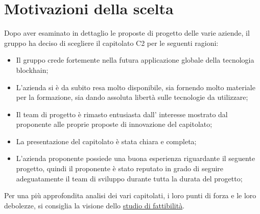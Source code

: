 \section{Motivazioni della scelta}\label{section:motivazioni}

Dopo aver esaminato in dettaglio le proposte di progetto delle varie aziende,
 il gruppo ha deciso di scegliere il capitolato C2 per le seguenti ragioni:
\begin{itemize}
    \item Il gruppo crede fortemente nella futura applicazione globale della tecnologia blockhain;
    \item L'azienda si è da subito resa molto disponibile, sia fornendo molto materiale per la formazione, sia dando assoluta libertà sulle tecnologie da utilizzare;
    \item Il team di progetto è rimasto entusiasta dall' interesse mostrato dal proponente alle proprie proposte di innovazione del capitolato;
    \item La presentazione del capitolato è stata chiara e completa;
    \item L'azienda proponente possiede una buona esperienza riguardante il seguente progetto, quindi il proponente è stato reputato in grado di seguire adeguatamente il team di sviluppo durante tutta la durata del progetto;
\end{itemize}

Per una più approfondita analisi dei vari capitolati,
 i loro punti di forza e le loro debolezze, si consiglia la visione dello \href{https://yakuzaishi-swe.github.io/docs/docs/studio_fattibilita.pdf}{studio di fattibilità}.
